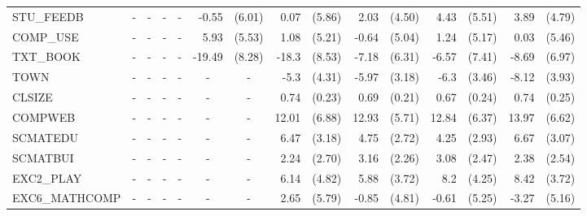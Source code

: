 \documentclass[10pt]{article}
\begin{document}
\begin{table}[htbp]
\begin{tabular}{lrlrlrlrlrlrlrl}
STU\_FEEDB & \multicolumn{1}{c}{-} & \multicolumn{1}{c}{-} & \multicolumn{1}{c}{-} & \multicolumn{1}{c}{-} & -0.55 & (6.01) & 0.07  & (5.86) & 2.03  & (4.50) & 4.43  & (5.51) & 3.89  & (4.79) \\[0.2em]
COMP\_USE & \multicolumn{1}{c}{-} & \multicolumn{1}{c}{-} & \multicolumn{1}{c}{-} & \multicolumn{1}{c}{-} & 5.93  & (5.53) & 1.08  & (5.21) & -0.64 & (5.04) & 1.24  & (5.17) & 0.03  & (5.46) \\[0.2em]
TXT\_BOOK & \multicolumn{1}{c}{-} & \multicolumn{1}{c}{-} & \multicolumn{1}{c}{-} & \multicolumn{1}{c}{-} & -19.49 & (8.28) & -18.3 & (8.53) & -7.18 & (6.31) & -6.57 & (7.41) & -8.69 & (6.97) \\[0.2em]
TOWN  & \multicolumn{1}{c}{-} & \multicolumn{1}{c}{-} & \multicolumn{1}{c}{-} & \multicolumn{1}{c}{-} & \multicolumn{1}{c}{-} & \multicolumn{1}{c}{-} & -5.3  & (4.31) & -5.97 & (3.18) & -6.3  & (3.46) & -8.12 & (3.93) \\[0.2em]
CLSIZE & \multicolumn{1}{c}{-} & \multicolumn{1}{c}{-} & \multicolumn{1}{c}{-} & \multicolumn{1}{c}{-} & \multicolumn{1}{c}{-} & \multicolumn{1}{c}{-} & 0.74  & (0.23) & 0.69  & (0.21) & 0.67  & (0.24) & 0.74  & (0.25) \\[0.2em]
COMPWEB & \multicolumn{1}{c}{-} & \multicolumn{1}{c}{-} & \multicolumn{1}{c}{-} & \multicolumn{1}{c}{-} & \multicolumn{1}{c}{-} & \multicolumn{1}{c}{-} & 12.01 & (6.88) & 12.93 & (5.71) & 12.84 & (6.37) & 13.97 & (6.62) \\[0.2em]
SCMATEDU & \multicolumn{1}{c}{-} & \multicolumn{1}{c}{-} & \multicolumn{1}{c}{-} & \multicolumn{1}{c}{-} & \multicolumn{1}{c}{-} & \multicolumn{1}{c}{-} & 6.47  & (3.18) & 4.75  & (2.72) & 4.25  & (2.93) & 6.67  & (3.07) \\[0.2em]
SCMATBUI & \multicolumn{1}{c}{-} & \multicolumn{1}{c}{-} & \multicolumn{1}{c}{-} & \multicolumn{1}{c}{-} & \multicolumn{1}{c}{-} & \multicolumn{1}{c}{-} & 2.24  & (2.70) & 3.16  & (2.26) & 3.08  & (2.47) & 2.38  & (2.54) \\[0.2em]
EXC2\_PLAY & \multicolumn{1}{c}{-} & \multicolumn{1}{c}{-} & \multicolumn{1}{c}{-} & \multicolumn{1}{c}{-} & \multicolumn{1}{c}{-} & \multicolumn{1}{c}{-} & 6.14  & (4.82) & 5.88  & (3.72) & 8.2   & (4.25) & 8.42  & (3.72) \\[0.2em]
EXC6\_MATHCOMP & \multicolumn{1}{c}{-} & \multicolumn{1}{c}{-} & \multicolumn{1}{c}{-} & \multicolumn{1}{c}{-} & \multicolumn{1}{c}{-} & \multicolumn{1}{c}{-} & 2.65  & (5.79) & -0.85 & (4.81) & -0.61 & (5.25) & -3.27 & (5.16) \\[0.2em]

\end{tabular}
\end{table}
\end{document}
